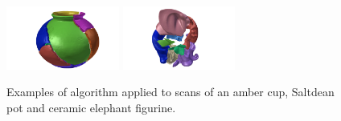 \documentclass[acmlarge,screen,dvipsnames]{acmart}
\begin{document}
\begin{figure}[htb]
  \includegraphics[width=0.33\textwidth]{images/saltdeanpuzzle4}%
  \includegraphics[width=0.33\textwidth]{images/elephantpuzzle4}
  \caption{\label{fig:three-shapes-with-different-fractures}%
    Examples of algorithm applied to scans of an amber cup, Saltdean pot and
    ceramic elephant figurine.}
\end{figure}
\end{document}
